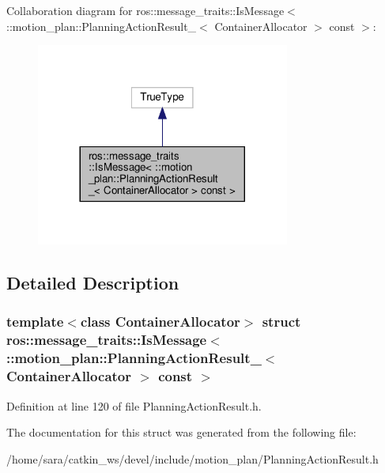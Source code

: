 Collaboration diagram for ros\+:\+:message\+\_\+traits\+:\+:Is\+Message$<$ \+:\+:motion\+\_\+plan\+:\+:Planning\+Action\+Result\+\_\+$<$ Container\+Allocator $>$ const $>$\+:
\nopagebreak
\begin{figure}[H]
\begin{center}
\leavevmode
\includegraphics[width=236pt]{structros_1_1message__traits_1_1IsMessage_3_01_1_1motion__plan_1_1PlanningActionResult___3_01Conf8e2f6424ce897201aa2050e2955cac8}
\end{center}
\end{figure}


\subsection{Detailed Description}
\subsubsection*{template$<$class Container\+Allocator$>$\newline
struct ros\+::message\+\_\+traits\+::\+Is\+Message$<$ \+::motion\+\_\+plan\+::\+Planning\+Action\+Result\+\_\+$<$ Container\+Allocator $>$ const $>$}



Definition at line 120 of file Planning\+Action\+Result.\+h.



The documentation for this struct was generated from the following file\+:\begin{DoxyCompactItemize}
\item 
/home/sara/catkin\+\_\+ws/devel/include/motion\+\_\+plan/Planning\+Action\+Result.\+h\end{DoxyCompactItemize}
